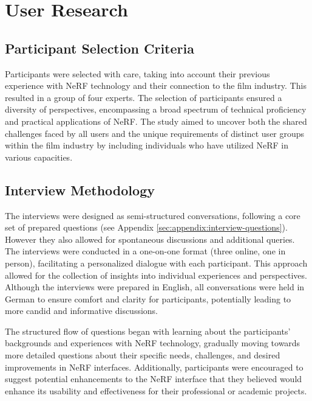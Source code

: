 %
\chapter{User Research}
\label{sec:user-research}

\section{Participant Selection Criteria}
\label{sec:user-research:criteria}

Participants were selected with care, taking into account their previous experience with NeRF technology and their connection to the film industry. 
This resulted in a group of four experts. 
The selection of participants ensured a diversity of perspectives, encompassing a broad spectrum of technical proficiency and practical applications of NeRF. 
The study aimed to uncover both the shared challenges faced by all users and the unique requirements of distinct user groups within the film industry by including individuals who have utilized NeRF in various capacities.

\section{Interview Methodology}
\label{sec:user-research:interview}

The interviews were designed as semi-structured conversations, following a core set of prepared questions (see Appendix \ref{sec:appendix:interview-questions}).
However they also allowed for spontaneous discussions and additional queries. 
The interviews were conducted in a one-on-one format (three online, one in person), facilitating a personalized dialogue with each participant. This approach allowed for the collection of insights into individual experiences and perspectives. 
Although the interviews were prepared in English, all conversations were held in German to ensure comfort and clarity for participants, potentially leading to more candid and informative discussions.

The structured flow of questions began with learning about the participants' backgrounds and experiences with NeRF technology, gradually moving towards more detailed questions about their specific needs, challenges, and desired improvements in NeRF interfaces. 
Additionally, participants were encouraged to suggest potential enhancements to the NeRF interface that they believed would enhance its usability and effectiveness for their professional or academic projects.

